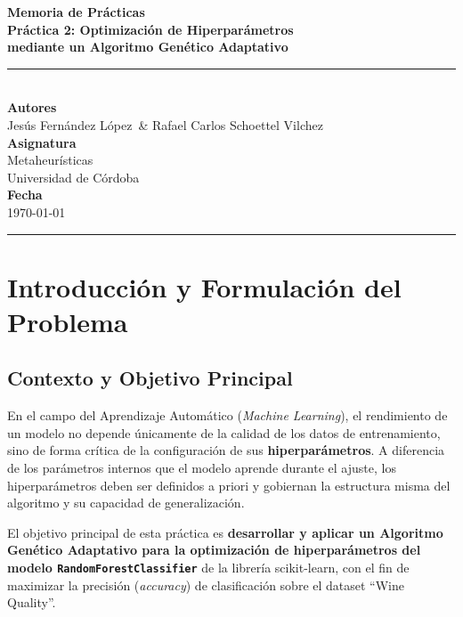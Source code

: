 \documentclass[12pt, a4paper]{article}
\newcommand{\reporttitle}{Práctica 2: Optimización de Hiperparámetros\\[0.3cm]
\large mediante un Algoritmo Genético Adaptativo}
\newcommand{\reportdate}{\today}
\newcommand{\authorA}{Jesús Fernández López}
\newcommand{\authorB}{Rafael Carlos Schoettel Vilchez}
\begin{document}

\begin{titlepage}
  \centering
  \vspace*{3cm}
  {\Huge \textbf{Memoria de Prácticas}}\\[0.8cm]
  {\LARGE \textbf{\reporttitle}}\\[0.5cm]
  \rule{\textwidth}{0.4pt}\\[2cm]
  {\Large \textbf{Autores}}\\[0.4cm]
  {\large \authorA\ \& \authorB}\\[1.5cm]
  {\Large \textbf{Asignatura}}\\[0.4cm]
  {\large Metaheurísticas}\\[0.4cm]
  {\normalsize Universidad de Córdoba}\\[1.5cm]
  {\Large \textbf{Fecha}}\\[0.4cm]
  {\large \reportdate}
  \vfill
  \rule{\textwidth}{0.4pt}
\end{titlepage}

\newpage
\tableofcontents
\newpage

\section{Introducción y Formulación del Problema}

\subsection{Contexto y Objetivo Principal}

En el campo del Aprendizaje Automático (\textit{Machine Learning}), el rendimiento de un
modelo no depende únicamente de la calidad de los datos de entrenamiento, sino de forma
crítica de la configuración de sus \textbf{hiperparámetros}. A diferencia de los parámetros
internos que el modelo aprende durante el ajuste, los hiperparámetros deben ser definidos
a priori y gobiernan la estructura misma del algoritmo y su capacidad de generalización.

El objetivo principal de esta práctica es \textbf{desarrollar y aplicar un Algoritmo
Genético Adaptativo para la optimización de hiperparámetros del modelo
\texttt{RandomForestClassifier}} de la librería scikit-learn, con el fin de maximizar la
precisión (\textit{accuracy}) de clasificación sobre el dataset ``Wine Quality''.
\end{document}
